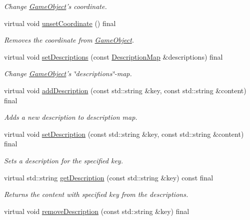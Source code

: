 \begin{DoxyCompactItemize}
\begin{DoxyCompactList}\small\item\em Change \hyperlink{classCourse_1_1GameObject}{Game\-Object}'s coordinate. \end{DoxyCompactList}\item 
virtual void \hyperlink{classCourse_1_1GameObject_a9deee37f01710a4d5b8968caadc01b0e}{unset\-Coordinate} () final
\begin{DoxyCompactList}\small\item\em Removes the coordinate from \hyperlink{classCourse_1_1GameObject}{Game\-Object}. \end{DoxyCompactList}\item 
virtual void \hyperlink{classCourse_1_1GameObject_a7b0790f1bd831bd7efa68b7d135a32cb}{set\-Descriptions} (const \hyperlink{namespaceCourse_aed04c39dde5a591d4b353686d3d0e306}{Description\-Map} \&descriptions) final
\begin{DoxyCompactList}\small\item\em Change \hyperlink{classCourse_1_1GameObject}{Game\-Object}'s \char`\"{}descriptions\char`\"{}-\/map. \end{DoxyCompactList}\item 
virtual void \hyperlink{classCourse_1_1GameObject_a0af72e3a237cefda5dc6d2b13a6e5881}{add\-Description} (const std\-::string \&key, const std\-::string \&content) final
\begin{DoxyCompactList}\small\item\em Adds a new description to description map. \end{DoxyCompactList}\item 
virtual void \hyperlink{classCourse_1_1GameObject_af94a781ae557e795e4fca8932cb05abb}{set\-Description} (const std\-::string \&key, const std\-::string \&content) final
\begin{DoxyCompactList}\small\item\em Sets a description for the specified key. \end{DoxyCompactList}\item 
virtual std\-::string \hyperlink{classCourse_1_1GameObject_a9b9e4340460debcbc7f97e48ef6fb437}{get\-Description} (const std\-::string \&key) const final
\begin{DoxyCompactList}\small\item\em Returns the content with specified key from the descriptions. \end{DoxyCompactList}\item 
virtual void \hyperlink{classCourse_1_1GameObject_a94262eeb0c85d5285e275080d19eb334}{remove\-Description} (const std\-::string \&key) final

\end{DoxyCompactItemize}
